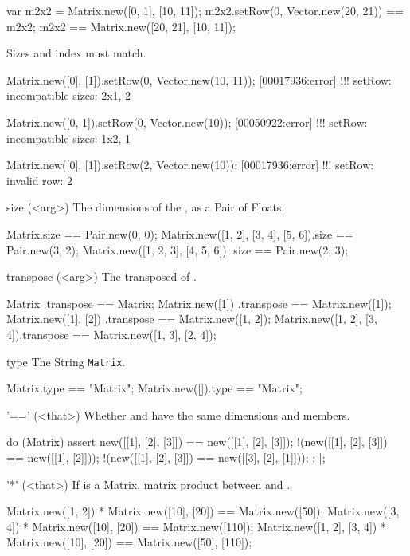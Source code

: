 \begin{urbiscriptapi}
\begin{urbiassert}
var m2x2 = Matrix.new([0, 1], [10, 11]);
m2x2.setRow(0, Vector.new(20, 21)) == m2x2;
m2x2 == Matrix.new([20, 21], [10, 11]);
\end{urbiassert}

  Sizes and index must match.
\begin{urbiscript}
Matrix.new([0], [1]).setRow(0, Vector.new(10, 11));
[00017936:error] !!! setRow: incompatible sizes: 2x1, 2

Matrix.new([0, 1]).setRow(0, Vector.new(10));
[00050922:error] !!! setRow: incompatible sizes: 1x2, 1

Matrix.new([0], [1]).setRow(2, Vector.new(10));
[00017936:error] !!! setRow: invalid row: 2
\end{urbiscript}


\item[size](<arg>)%
  The dimensions of the \this, as a Pair of Floats.
\begin{urbiassert}
Matrix.size == Pair.new(0, 0);
Matrix.new([1, 2], [3, 4], [5, 6]).size == Pair.new(3, 2);
Matrix.new([1, 2, 3], [4, 5, 6])  .size == Pair.new(2, 3);
\end{urbiassert}

\item[transpose](<arg>)%
  The transposed of \this.
\begin{urbiassert}
Matrix                    .transpose == Matrix;
Matrix.new([1])           .transpose == Matrix.new([1]);
Matrix.new([1], [2])      .transpose == Matrix.new([1, 2]);
Matrix.new([1, 2], [3, 4]).transpose == Matrix.new([1, 3], [2, 4]);
\end{urbiassert}


\item[type]%
  The String \lstinline|Matrix|.
\begin{urbiassert}
Matrix.type         == "Matrix";
Matrix.new([]).type == "Matrix";
\end{urbiassert}


\item['=='](<that>)%
  Whether \this and \that have the same dimensions and members.
\begin{urbiscript}
do (Matrix)
{
  assert
  {
      new([[1], [2], [3]]) == new([[1], [2], [3]]);
    !(new([[1], [2], [3]]) == new([[1], [2]]));
    !(new([[1], [2], [3]]) == new([[3], [2], [1]]));
  };
}|;
\end{urbiscript}


\item['*'](<that>)%
  If \that is a Matrix, matrix product between \this and \that.
\begin{urbiassert}
Matrix.new([1, 2]) * Matrix.new([10], [20])
  == Matrix.new([50]);
Matrix.new([3, 4]) * Matrix.new([10], [20])
  == Matrix.new([110]);
Matrix.new([1, 2], [3, 4]) * Matrix.new([10], [20])
  == Matrix.new([50], [110]);
\end{urbiassert}


\end{urbiscriptapi}
